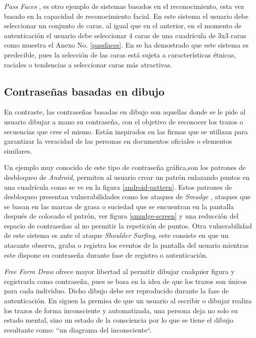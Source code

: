 \textit{Pass Faces} \cite{Tuscano2015GraphicalPA}, \cite{inproceedings} es otro ejemplo de sistemas basados en el reconocimiento, esta vez basado en la capacidad de reconocimiento facial. En este sistema el usuario debe seleccionar un conjunto de caras, al igual que en el anterior, en el momento de autenticación el usuario debe seleccionar 4 caras de una cuadrícula de 3x3 caras como muestra el Anexo No. \ref{passfaces}. En \cite{Tuscano2015GraphicalPA} se ha demostrado que este sistema es predecible, pues la selección de las caras está sujeta a características étnicas, raciales o tendencias a seleccionar caras más atractivas.





\subsection{Contraseñas basadas en dibujo}
En contraste, las contraseñas basadas en dibujo son aquellas donde se le pide al usuario dibujar a mano su contraseña, con el objetivo de reconocer los trazos o secuencias que cree el mismo. Están inspirados en las firmas que se utilizan para garantizar la veracidad de las personas en documentos oficiales o elementos similares. 

Un ejemplo muy conocido de este tipo de contraseña gráfica,son los patrones de desbloqueo de \textit{Android}, permiten al usuario crear un patrón enlazando puntos en una cuadrícula como se ve en la figura \ref{android-pattern}. Estos patrones de desbloqueo presentan vulnerabilidades como los ataques de \emph{Smudge} \cite{aviv2010smudge}, ataques que se basan en las marcas de grasa o suciedad que se encuentran en la pantalla despu\'es de colocado el patr\'on, ver figura \ref{smudge-screen} y una reducción del espacio de contraseñas al no permitir la repetición de puntos. Otra vulnerabilidad de este sistema  es ante el ataque \emph{Shoulder Surfing}, este consiste en que un atacante observa, graba o registra los eventos de la pantalla del usuario mientras este dispone su contraseña durante fase de registro o autenticación.






\textit{Free Form Draw} \cite{lin2009free} ofrece mayor libertad al permitir dibujar cualquier figura y registrarla como contraseña, pues se basa en la idea de que los trazos son únicos para cada individuo. Dicho dibujo debe ser reproducido durante la fase de autenticación. En \cite{lin2009free} siguen la premisa de que un usuario al escribir o dibujar realiza los trazos de forma inconsciente y automatizada, una persona deja no solo su estado mental, sino un estado de la consciencia por lo que se tiene el dibujo resultante como: ``un diagrama del inconsciente``.

